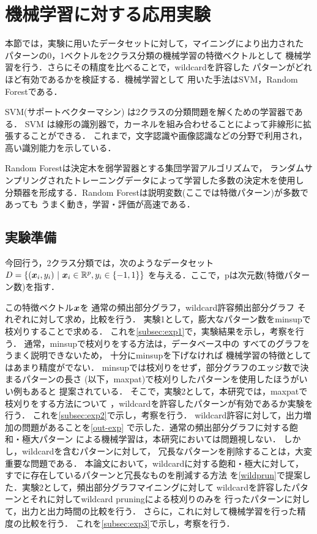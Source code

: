 \section{機械学習に対する応用実験}
本節では，実験に用いたデータセットに対して，マイニングにより出力された
パターンの0，1ベクトルを2クラス分類の機械学習の特徴ベクトルとして
機械学習を行う．さらにその精度を比べることで，wildcardを許容した
パターンがどれほど有効であるかを検証する．機械学習として
用いた手法はSVM，Random Forestである．%

SVM(サポートベクターマシン) は2クラスの分類問題を解くための学習器である．
SVM は線形の識別器で，カーネルを組み合わせることによって非線形に拡張することができる．
これまで，文字認識や画像認識などの分野で利用され，高い識別能力を示している．

Random Forestは決定木を弱学習器とする集団学習アルゴリズムで，
ランダムサンプリングされたトレーニングデータによって学習した多数の決定木を使用し
分類器を形成する．Random Forestは説明変数(ここでは特徴パターン)が多数であっても
うまく動き，学習・評価が高速である．

\subsection{実験準備}

今回行う，2クラス分類では，次のようなデータセット
$D=\{(\mbox{\boldmath $x$}_i,y_i)\ |\ \mbox{\boldmath $x$}_i\in \mathbb{R}^p,y_i\in \{-1,1\}\}$
を与える．ここで，pは次元数(特徴パターン数)を指す．

この特徴ベクトル$\mbox{\boldmath $x$}$を
通常の頻出部分グラフ，wildcard許容頻出部分グラフ
それぞれに対して求め，比較を行う．
実験1として，膨大なパターン数をminsupで枝刈りすることで求める．
これを\ref{subsec:exp1}で，実験結果を示し，考察を行う．
通常，minsupで枝刈りをする方法は，データベース中の
すべてのグラフをうまく説明できないため，
十分にminsupを下げなければ
機械学習の特徴としてはあまり精度がでない．
minsupでは枝刈りをせず，部分グラフのエッジ数で決まるパターンの長さ
(以下，maxpat)で枝刈りしたパターンを使用したほうがいい例もあると
提案されている．%
そこで，実験2として，本研究では，maxpatで枝刈りをする方法について
，wildcardを許容したパターンが有効であるか実験を行う．
これを\ref{subsec:exp2}で示し，考察を行う．
\fi
wildcard許容に対して，出力増加の問題があることを\ref{out-exp}
で示した．通常の頻出部分グラフに対する飽和・極大パターン
による機械学習は，本研究においては問題視しない．
しかし，wildcardを含むパターンに対して，
冗長なパターンを削除することは，大変重要な問題である．
本論文において，wildcardに対する飽和・極大に対して，
すでに存在しているパターンと冗長なものを削減する方法
を\ref{wildprun}で提案した．実験2として，頻出部分グラフマイニングに対して
wildcardを許容したパターンとそれに対してwildcard pruningによる枝刈りのみを
行ったパターンに対して，出力と出力時間の比較を行う．
さらに，これに対して機械学習を行った精度の比較を行う．
これを\ref{subsec:exp3}で示し，考察を行う．

